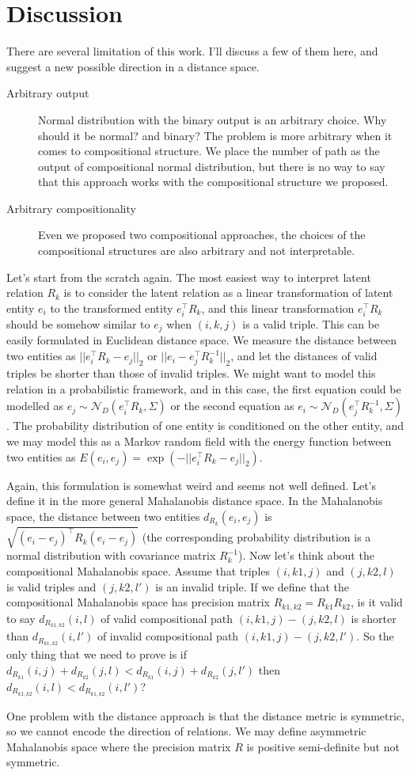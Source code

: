 \section{Discussion}
There are several limitation of this work. I'll discuss a few of them here, and suggest a new possible direction in a distance space.
\begin{description}
\item[Arbitrary output] Normal distribution with the binary output is an arbitrary choice. Why should it be normal? and binary? The problem is more arbitrary when it comes to compositional structure. We place the number of path as the output of compositional normal distribution, but there is no way to say that this approach works with the compositional structure we proposed.
\item[Arbitrary compositionality] Even we proposed two compositional approaches, the choices of the compositional structures are also arbitrary and not interpretable.
\end{description}

Let's start from the scratch again. The most easiest way to interpret latent relation $R_k$ is to consider the latent relation as a linear transformation of latent entity $e_i$ to the transformed entity $e_i^\top R_k$, and this linear transformation $e_i^\top R_k$ should be somehow similar to $e_j$ when $(i, k, j)$ is a valid triple. This can be easily formulated in Euclidean distance space. We measure the distance between two entities as $|| e_i^\top R_k - e_j ||_2$ or $|| e_i - e_j^\top R_k^{-1} ||_2$, and let the distances of valid triples be shorter than those of invalid triples. We might want to model this relation in a probabilistic framework, and in this case, the first equation could be modelled as $e_j \sim \mathcal{N}_D(e_i^\top R_k, \Sigma)$ or the second equation as $e_i \sim \mathcal{N}_D(e_j^\top R_k^{-1}, \Sigma)$. The probability distribution of one entity is conditioned on the other entity, and we may model this as a Markov random field with the energy function between two entities as $E(e_i, e_j) = \exp(-||e_i^\top R_k - e_j||_2)$.

Again, this formulation is somewhat weird and seems not well defined. Let's define it in the more general Mahalanobis distance space. In the Mahalanobis space, the distance between two entities $d_{R_k}(e_i, e_j)$ is $\sqrt{(e_i-e_j)^\top R_k (e_i - e_j)}$ (the corresponding probability distribution is a normal distribution with covariance matrix $R_k^{-1}$). 
Now let's think about the compositional Mahalanobis space. Assume that triples $(i, k1, j)$ and $(j, k2, l)$ is valid triples and $(j, k2, l')$ is an invalid triple. If we define that the compositional Mahalanobis space has precision matrix $R_{k1,k2} = R_{k1} R_{k2}$, is it valid to say $d_{R_{k1,k2}}(i, l)$  of valid compositional path $(i, k1, j) - (j, k2, l)$ is shorter than $d_{R_{k1,k2}}(i, l')$ of invalid compositional path $(i, k1, j)-(j, k2, l')$. So the only thing that we need to prove is if $d_{R_{k1}}(i, j) + d_{R_{k2}}(j, l) < d_{R_{k1}}(i, j) + d_{R_{k2}}(j, l')$ then $d_{R_{k1,k2}}(i, l) < d_{R_{k1,k2}}(i, l')$?

One problem with the distance approach is that the distance metric is symmetric, so we cannot encode the direction of relations. We may define asymmetric Mahalanobis space where the precision matrix $R$ is positive semi-definite but not symmetric.

